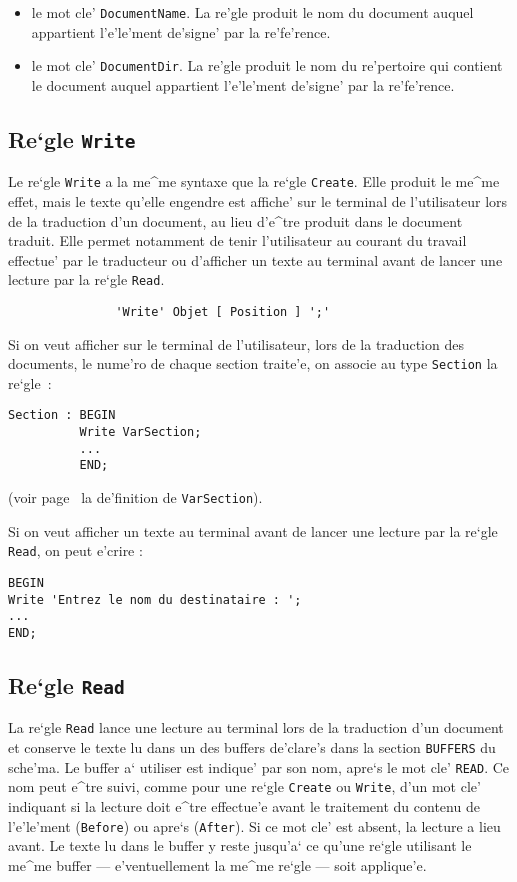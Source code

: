 {\begin{itemize}
\item le mot cle' {\tt DocumentName}. La re'gle produit le nom du
 document auquel appartient l'e'le'ment de'signe' par la re'fe'rence.

\item le mot cle' {\tt DocumentDir}.  La re'gle produit le nom du
 re'pertoire qui contient le document auquel appartient l'e'le'ment
 de'signe' par la re'fe'rence.
\end{itemize}

\subsection{Re`gle {\tt Write}}

Le re`gle {\tt Write} a la me^me syntaxe que la re`gle {\tt Create}. Elle
produit le me^me effet, mais le texte qu'elle engendre est affiche' sur le
terminal de l'utilisateur lors de la traduction d'un document, au lieu
d'e^tre produit dans le document traduit. Elle permet notamment de tenir
l'utilisateur au courant du travail effectue' par le traducteur ou d'afficher
un texte au terminal avant de lancer une lecture par la re`gle {\tt Read}.

\begin{verbatim}
               'Write' Objet [ Position ] ';'
\end{verbatim}

\begin{example}
Si on veut afficher sur le terminal de l'utilisateur, lors de la traduction
des documents, le nume'ro de chaque section traite'e, on associe au type
{\tt Section} la re`gle~:
\begin{verbatim}
Section : BEGIN
          Write VarSection;
          ...
          END;
\end{verbatim}
(voir page~\pageref{varsect} la de'finition de {\tt VarSection}).

Si on veut afficher un texte au terminal avant de lancer une lecture
par la re`gle {\tt Read}, on peut e'crire :
\begin{verbatim}
BEGIN
Write 'Entrez le nom du destinataire : ';
...
END;
\end{verbatim}
\end{example}

\subsection{Re`gle {\tt Read}}

La re`gle {\tt Read} lance une lecture au terminal lors de la traduction
d'un document et conserve le texte lu dans un des buffers de'clare's dans
la section {\tt BUFFERS} du sche'ma. Le buffer a` utiliser est indique' par
son nom, apre`s le mot cle' {\tt READ}. Ce nom peut e^tre suivi, comme pour
une re`gle {\tt Create} ou {\tt Write}, d'un mot cle' indiquant si la
lecture doit e^tre effectue'e avant le traitement du contenu de l'e'le'ment
({\tt Before}) ou apre`s ({\tt After}). Si ce mot cle' est absent, la
lecture a lieu avant. Le texte lu dans le buffer y reste jusqu'a` ce qu'une
re`gle utilisant le me^me buffer --- e'ventuellement la me^me re`gle --- soit
applique'e.

}
